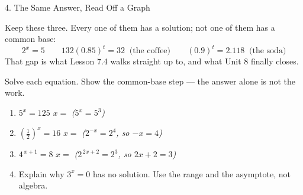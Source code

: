 \documentclass[10pt]{article}
\begin{document}
\begin{notesbox}{4. The Same Answer, Read Off a Graph}
\begin{tcolorbox}[colback=sky, colframe=navy, boxrule=0.8pt, arc=1.5mm,
    left=2.5mm, right=2.5mm, top=1.5mm, bottom=1.5mm]
\vspace{2pt}
Keep these three. Every one of them has a solution; not one of them has a common base:
\[
  2^{x}=5 \qquad 132(0.85)^{t}=32 \;\;\text{(the coffee)} \qquad (0.9)^{t}=2.118 \;\;\text{(the soda)}
\]
That gap is what Lesson 7.4 walks straight up to, and what Unit 8 finally closes.
\end{tcolorbox}
\end{notesbox}

\begin{practicebox}
Solve each equation. Show the common-base step --- the answer alone is not the work.
\begin{enumerate}[leftmargin=1.7em, itemsep=9pt]
  \item $5^{x}=125$ \hfill $x=$  \quad \emph{($5^{x}=5^{3}$)}

  \item $\left(\frac{1}{2}\right)^{x}=16$ \hfill $x=$  \quad \emph{($2^{-x}=2^{4}$, so $-x=4$)}

  \item $4^{\,x+1}=8$ \hfill $x=$  \quad \emph{($2^{\,2x+2}=2^{3}$, so $2x+2=3$)}

  \item Explain why $3^{x}=0$ has no solution. Use the range and the asymptote, not algebra.
\end{enumerate}
\end{practicebox}
\end{document}
